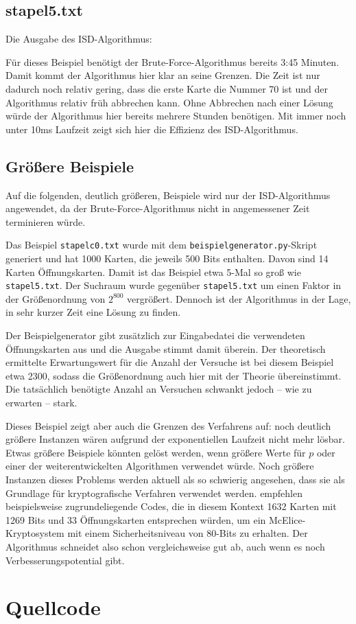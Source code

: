 \documentclass[a4paper,10pt,ngerman]{scrartcl}
\begin{document}
\subsection*{stapel5.txt}
Die Ausgabe des ISD-Algorithmus:

Für dieses Beispiel benötigt der Brute-Force-Algorithmus bereits 3:45 Minuten. Damit kommt der Algorithmus hier klar an seine Grenzen. Die Zeit ist nur dadurch noch relativ gering, dass die erste Karte die Nummer 70 ist und der Algorithmus relativ früh abbrechen kann. Ohne Abbrechen nach einer Lösung würde der Algorithmus hier bereits mehrere Stunden benötigen.
Mit immer noch unter 10ms Laufzeit zeigt sich hier die Effizienz des ISD-Algorithmus.
\subsection{Größere Beispiele}
Auf die folgenden, deutlich größeren, Beispiele wird nur der ISD-Algorithmus angewendet, da der Brute-Force-Algorithmus nicht in angemessener Zeit terminieren würde.

Das Beispiel \lstinline{stapelc0.txt} wurde mit dem \lstinline{beispielgenerator.py}-Skript generiert und hat 1000 Karten, die jeweils 500 Bits enthalten. Davon sind 14 Karten Öffnungskarten. Damit ist das Beispiel etwa 5-Mal so groß wie \lstinline{stapel5.txt}. Der Suchraum wurde gegenüber \lstinline{stapel5.txt} um einen Faktor in der Größenordnung von $2^{800}$ vergrößert. Dennoch ist der Algorithmus in der Lage, in sehr kurzer Zeit eine Lösung zu finden.

Der Beispielgenerator gibt zusätzlich zur Eingabedatei die verwendeten Öffnungskarten aus und die Ausgabe stimmt damit überein. 
Der theoretisch ermittelte Erwartungswert für die Anzahl der Versuche ist bei diesem Beispiel etwa 2300, sodass die Größenordnung auch hier mit der Theorie übereinstimmt. Die tatsächlich benötigte Anzahl an Versuchen schwankt jedoch -- wie zu erwarten -- stark.

Dieses Beispiel zeigt aber auch die Grenzen des Verfahrens auf: noch deutlich größere Instanzen wären aufgrund der exponentiellen Laufzeit nicht mehr lösbar. Etwas größere Beispiele könnten gelöst werden, wenn größere Werte für $p$ oder einer der weiterentwickelten Algorithmen verwendet würde.
Noch größere Instanzen dieses Problems werden aktuell als so schwierig angesehen, dass sie als Grundlage für kryptografische Verfahren verwendet werden. \citeauthor{bernsteinAttackingDefendingMcEliece2008} empfehlen beispielsweise zugrundeliegende Codes, die in diesem Kontext 1632 Karten mit 1269 Bits und 33 Öffnungskarten entsprechen würden, um ein McElice-Kryptosystem mit einem Sicherheitsniveau von 80-Bits zu erhalten. \cite{bernsteinAttackingDefendingMcEliece2008}
Der Algorithmus schneidet also schon vergleichsweise gut ab, auch wenn es noch Verbesserungspotential gibt.
\section{Quellcode}



\printbibliography[heading=bibintoc]
\end{document}
